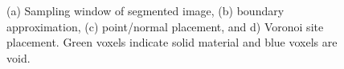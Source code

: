 \begin{figure}[ht]
{\label{fig:vor2}}
%
\caption{(a) Sampling window of segmented image, (b) boundary approximation, (c) point/normal placement, and d) Voronoi site placement. Green voxels indicate solid material and blue voxels are void.}
\label{fig:vor}
\end{figure}

